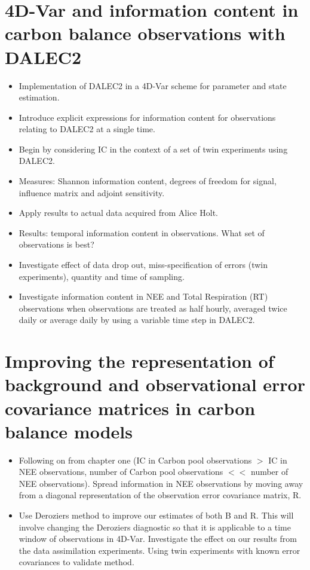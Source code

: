 \documentclass[11pt]{article}
\begin{document}
\section{4D-Var and information content in carbon balance observations with DALEC2}
\begin{itemize}
\item Implementation of DALEC2 in a 4D-Var scheme for parameter and state estimation. 
\item Introduce explicit expressions for information content for observations relating to DALEC2 at a single time.
\item Begin by considering IC in the context of a set of twin experiments using DALEC2.
\item Measures: Shannon information content, degrees of freedom for signal, influence matrix and adjoint sensitivity.
\item Apply results to actual data acquired from Alice Holt.
\item Results: temporal information content in observations. What set of observations is best?
\item Investigate effect of data drop out, miss-specification of errors (twin experiments), quantity and time of sampling.
\item Investigate information content in NEE and Total Respiration (RT) observations when observations are treated as half hourly, averaged twice daily or average daily by using a variable time step in DALEC2.   
\end{itemize}


\section{Improving the representation of background and observational error covariance matrices in carbon balance models} 
\begin{itemize}
\item Following on from chapter one (IC in Carbon pool observations $>$ IC in NEE observations, number of Carbon pool observations $<<$ number of NEE observations). Spread information in NEE observations by moving away from a diagonal representation of the observation error covariance matrix, R.
\item Use Deroziers method to improve our estimates of both B and R. This will involve changing the Deroziers diagnostic so that it is applicable to a time window of observations in 4D-Var. Investigate the effect on our results from the data assimilation experiments. Using twin experiments with known error covariances to validate method.
\end{itemize}
\end{document}
